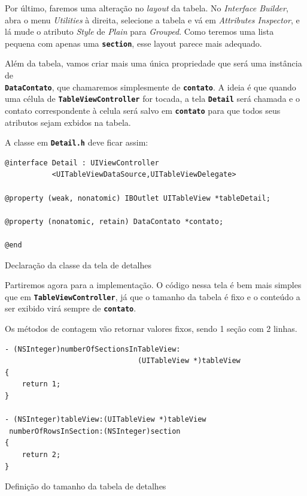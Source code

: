 \documentclass[a4paper,12pt,brazil,oneside]{book}
\begin{document}
Por último, faremos uma alteração no \emph{layout} da tabela. No \emph{Interface Builder}, abra o menu \emph{Utilities} à direita, selecione a tabela e vá em \emph{Attributes Inspector}, e lá mude o atributo \emph{Style} de \emph{Plain} para \emph{Grouped}. Como teremos uma lista pequena com apenas uma \texttt{\textbf{section}}, esse layout parece mais adequado.

Além da tabela, vamos criar mais uma única propriedade que será uma instância de\\
\texttt{\textbf{DataContato}}, que chamaremos simplesmente de \texttt{\textbf{contato}}. A ideia é que quando uma célula de \texttt{\textbf{TableViewController}} for tocada, a tela \texttt{\textbf{Detail}} será chamada e o contato correspondente à celula será salvo em \texttt{\textbf{contato}} para que todos seus atributos sejam exbidos na tabela.

A classe em \texttt{\textbf{Detail.h}} deve ficar assim:

\begin{listing}[H]
\begin{verbatim}
@interface Detail : UIViewController
           <UITableViewDataSource,UITableViewDelegate>

@property (weak, nonatomic) IBOutlet UITableView *tableDetail;

@property (nonatomic, retain) DataContato *contato;

@end
\end{verbatim}
\caption{Declaração da classe da tela de detalhes}
\end{listing}


Partiremos agora para a implementação. O código nessa tela é bem mais simples que em \texttt{\textbf{TableViewController}}, já que o tamanho da tabela é fixo e o conteúdo a ser exibido virá sempre de \texttt{\textbf{contato}}.

Os métodos de contagem vão retornar valores fixos, sendo 1 seção com 2 linhas.

\begin{listing}[H]
\begin{verbatim}
- (NSInteger)numberOfSectionsInTableView:
                               (UITableView *)tableView
{        
    return 1;
}

- (NSInteger)tableView:(UITableView *)tableView
 numberOfRowsInSection:(NSInteger)section
{
    return 2;
}
\end{verbatim}
\caption{Definição do tamanho da tabela de detalhes}
\end{listing}
\end{document}
